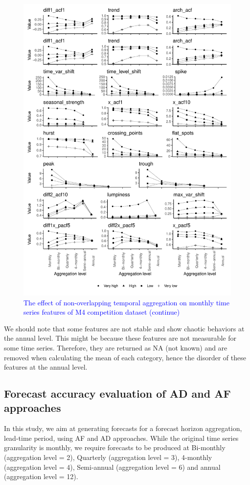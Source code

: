 \documentclass[preprint, 3p,
authoryear]{elsarticle} %
\begin{document}
\begin{figure}[H]

{\centering \includegraphics[width=0.7\linewidth]{img/mp_category_all2} 

}

\caption{ \textcolor{blue}{The effect of non-overlapping temporal aggregation on monthly time series features of M4 competition dataset (continue)} }\label{fig:featureagg2}
\end{figure}

We should note that some features are not stable and show chaotic
behaviors at the annual level. This might be because these features are
not measurable for some time series. Therefore, they are returned as NA
(not known) and are removed when calculating the mean of each category,
hence the disorder of these features at the annual level.

\hypertarget{forecast-accuracy-evaluation-of-ad-and-af-approaches}{%
\subsection{Forecast accuracy evaluation of AD and AF
approaches}\label{forecast-accuracy-evaluation-of-ad-and-af-approaches}}

In this study, we aim at generating forecasts for a forecast horizon
aggregation, lead-time period, using AF and AD approaches. While the
original time series granularity is monthly, we require forecasts to be
produced at Bi-monthly (aggregation level = 2), Quarterly (aggregation
level = 3), 4-monthly (aggregation level = 4), Semi-annual (aggregation
level = 6) and annual (aggregation level = 12).
\end{document}
